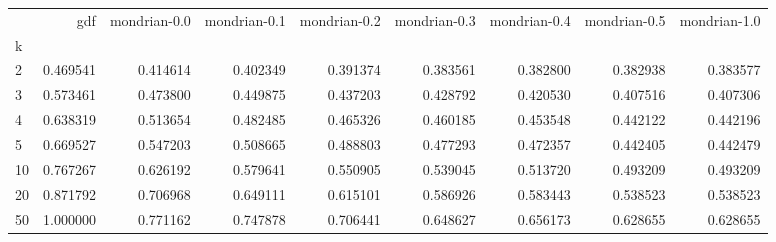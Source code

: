\begin{tabular}{lrrrrrrrr}
\toprule
{} &       gdf &  mondrian-0.0 &  mondrian-0.1 &  mondrian-0.2 &  mondrian-0.3 &  mondrian-0.4 &  mondrian-0.5 &  mondrian-1.0 \\
k  &           &               &               &               &               &               &               &               \\
\midrule
2  &  0.469541 &      0.414614 &      0.402349 &      0.391374 &      0.383561 &      0.382800 &      0.382938 &      0.383577 \\
3  &  0.573461 &      0.473800 &      0.449875 &      0.437203 &      0.428792 &      0.420530 &      0.407516 &      0.407306 \\
4  &  0.638319 &      0.513654 &      0.482485 &      0.465326 &      0.460185 &      0.453548 &      0.442122 &      0.442196 \\
5  &  0.669527 &      0.547203 &      0.508665 &      0.488803 &      0.477293 &      0.472357 &      0.442405 &      0.442479 \\
10 &  0.767267 &      0.626192 &      0.579641 &      0.550905 &      0.539045 &      0.513720 &      0.493209 &      0.493209 \\
20 &  0.871792 &      0.706968 &      0.649111 &      0.615101 &      0.586926 &      0.583443 &      0.538523 &      0.538523 \\
50 &  1.000000 &      0.771162 &      0.747878 &      0.706441 &      0.648627 &      0.656173 &      0.628655 &      0.628655 \\
\bottomrule
\end{tabular}
